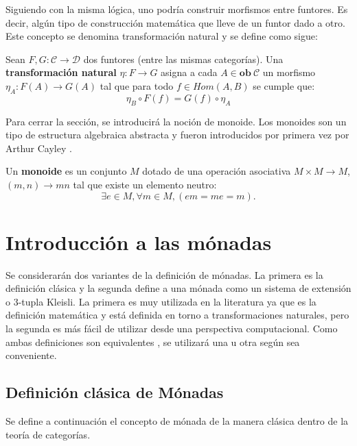 Siguiendo con la misma lógica, uno podría construir morfismos entre funtores. Es decir, algún tipo de construcción matemática que lleve de un funtor dado a otro. Este concepto se denomina transformación natural y se define como sigue:

\begin{definition}
Sean $\mathit{F}, \mathit{G} : \mathscr{C} \rightarrow \mathscr{D}$ dos funtores (entre las mismas categorías). Una \textbf{transformación natural} $\eta : \mathit{F} \rightarrow \mathit{G}$ asigna a cada $A \in \mathbf{ob} \ \mathscr{C}$ un morfismo $\eta_A : \mathit{F}(A) \rightarrow \mathit{G}(A)$ tal que para todo $f \in Hom(A,B)$ se cumple que: 
\begin{equation*}
	\eta_B \circ \mathit{F}(f) = \mathit{G}(f) \circ \eta_A 
\end{equation*}
\end{definition}

Para cerrar la sección, se introducirá la noción de monoide. Los monoides son un tipo de estructura algebraica abstracta y fueron introducidos por primera vez por Arthur Cayley \cite{}.

\begin{definition}[Monoide]
Un \textbf{monoide} es un conjunto $M$ dotado de una operación asociativa $M \times M \rightarrow M$, $(m,n) \rightarrow mn$ tal que existe un elemento neutro:
\begin{equation*}
\exists e \in M, \forall m \in M, (em = me = m).
\end{equation*}
\end{definition}

\section{Introducción a las mónadas}\label{monconc:monadas}

Se considerarán dos variantes de la definición de mónadas. La primera es la definición clásica y la segunda define a una mónada como un sistema de extensión o 3-tupla Kleisli. La primera es muy utilizada en la literatura ya que es la definición matemática y está definida en torno a transformaciones naturales, pero la segunda es más fácil de utilizar desde una perspectiva computacional. Como ambas definiciones son equivalentes \cite{moggi:1991}, se utilizará una u otra según sea conveniente.

\subsection{Definición clásica de Mónadas}\label{monadas:usual}
Se define a continuación el concepto de mónada de la manera clásica dentro de la teoría de categorías.

